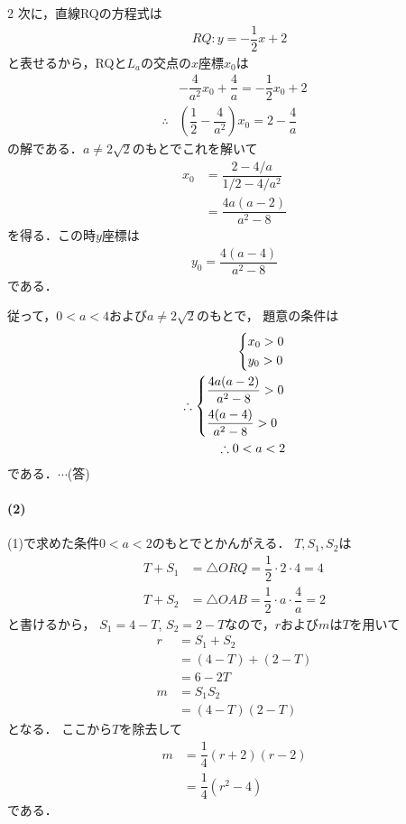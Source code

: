 \documentclass[../../main.tex]{subfiles}
\begin{document}
\begin{multicols}{2}
  次に，直線RQの方程式は
  \begin{align}
    & RQ:y=-\dfrac{1}{2}x+2  \label{eq:2}
  \end{align}
  と表せるから，RQと$L_a$の交点の$x$座標$x_0$は
  \begin{align}
    & -\dfrac{4}{a^2}x_0+\dfrac{4}{a} = -\dfrac{1}{2}x_0+2 \\
    \therefore
    & (\dfrac{1}{2}-\dfrac{4}{a^2})x_0 = 2-\dfrac{4}{a}
  \end{align}
  の解である．$a \neq 2\sqrt{2}$のもとでこれを解いて
  \begin{align}
    x_0
    & = \dfrac{2-4/a}{1/2-4/a^2}                    \\
    & = \dfrac{4a(a-2)}{a^2-8}  \label{eq:3}
  \end{align}
  を得る．この時$y$座標は
  \begin{align}
    y_0  =  \dfrac{4(a-4)}{a^2-8}  \label{eq:4}
  \end{align}
  である．

  従って，$0<a<4$および$a \neq 2\sqrt{2}$のもとで，
  題意の条件は
  \begin{align}
    \begin{dcases}
      x_0 > 0 \\
      y_0 > 0
    \end{dcases}             \\
    \therefore
    \begin{dcases}
      \dfrac{4a(a-2)}{a^2-8} > 0 \\
      \dfrac{4(a-4)}{a^2-8} > 0
    \end{dcases} \\
    \therefore
    0 < a < 2
  \end{align}
  である．$\cdots$(答)

  \paragraph{(2)}
  (1)で求めた条件$0<a<2$のもとでとかんがえる．
  $T,S_1,S_2$は
  \begin{align}
    T+S_1 & = \triangle ORQ = \dfrac{1}{2} \cdot 2 \cdot 4 = 4           \\
    T+S_2 & = \triangle OAB = \dfrac{1}{2} \cdot a \cdot \dfrac{4}{a} = 2
  \end{align}
  と書けるから，
  $S_1 = 4-T$, $S_2 = 2-T$なので，$r$および$m$は$T$を用いて
  \begin{align}
    r
    & = S_1+S_2                     \\
    & = (4-T)+(2-T)                 \\
    & = 6-2T    \label{eq:5} \\
    m
    & = S_1S_2                      \\
    & = (4-T)(2-T)
  \end{align}
  となる．
  ここから$T$を除去して
  \begin{align}
    m
    & = \dfrac{1}{4}(r+2)(r-2)                  \\
    & = \dfrac{1}{4}(r^2-4) \label{eq:6}
  \end{align}
  である．


\end{multicols}
\end{document}
